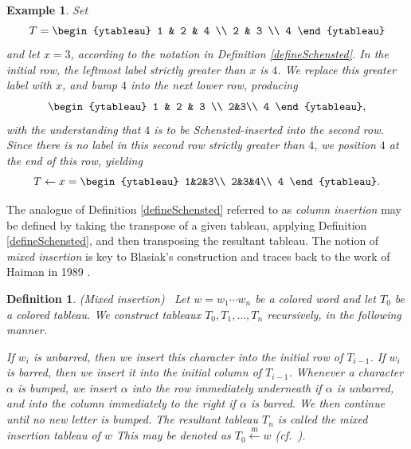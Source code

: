 \documentclass[12pt]{article}
\newtheorem{definition}{Definition}
\newtheorem{example}{Example}
\begin{document}
\begin{example}
 Set $$ T = \begin{ytableau} 1 & 2 & 4 \\ 2 & 3 \\ 4 \end{ytableau} $$ and let $x = 3$, according to the notation in Definition 
 \ref{defineSchensted}. In the initial row, the leftmost label strictly greater than $x$ is $4$. We replace this greater label with $x$, and 
 bump $4$ into the next lower row, producing $$\begin{ytableau} 1 & 2 & 3 \\ 
 2&3\\ 4 \end{ytableau}, $$ with the understanding that $4$ is to be Schensted-inserted into the second row. Since there is no label in 
 this second row strictly greater than $4$, we position $4$ at the end of this row, yielding 
\begin{equation*}
 T\leftarrow x = \begin{ytableau} 1&2&3\\ 2&3&4\\ 4 \end{ytableau}. 
\end{equation*}
\end{example}

 The analogue of Definition \ref{defineSchensted} referred to as \emph{column insertion} may be defined by taking the transpose of a 
 given tableau, applying Definition \ref{defineSchensted}, 
 and then transposing the resultant tableau. 
 The notion of \emph{mixed insertion} is key to Blasiak's construction 
 \cite{Blasiak20162018} and traces back to the work of Haiman in 1989 \cite{Haiman1989}.

\begin{definition}\label{mixedinsertion} 
 (Mixed insertion) \, Let $w=w_1\cdots w_n$ be a colored word and let $T_0$ be a colored tableau. We construct tableaux $T_0, 
 T_1, \dots, T_n$ recursively, in the following manner. 

 If $w_i$ is unbarred, then we insert this character into the initial row of $T_{i-1}$. If $w_i$ is barred, then we insert it into the initial 
 column of $T_{i-1}$. Whenever a character $\alpha$ is bumped, we insert $\alpha$ into the row immediately underneath if $\alpha$ is 
 unbarred, and into the column immediately to the right if $\alpha$ is barred. We then continue until no new letter is bumped. The 
 resultant tableau $T_n$ is called the \emph{mixed insertion tableau} of $w$ This may be denoted as $T_{0}
 \xleftarrow{\operatorname{m}} w$ \cite[Definition 2.4]{Blasiak20162018} (cf.\ \cite{Haiman1989}). 
\end{definition}
\end{document}
